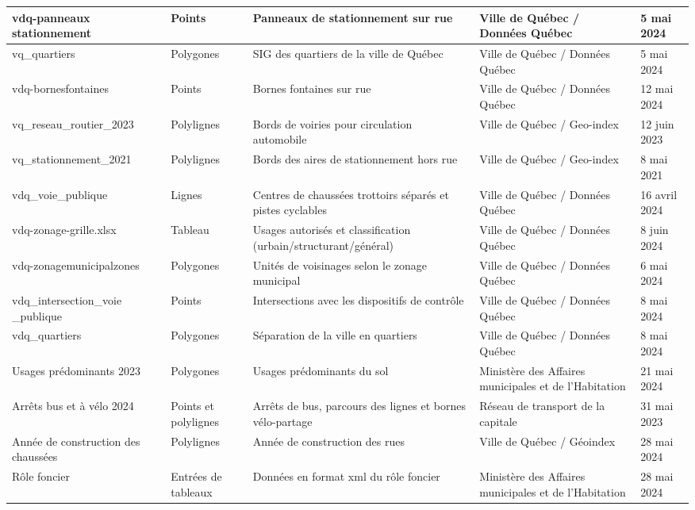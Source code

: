 \begin{landscape}
\begin{longtable}[h!]{p{.2 \linewidth} p{.1 \linewidth} p{.3 \linewidth} p{.15\linewidth} p{.125\linewidth} }
  
   vdq-panneaux stationnement    & Points        & Panneaux de stationnement sur rue          & Ville de Québec / Données Québec  & 5 mai 2024 \\
   \hline
   vq\_quartiers & Polygones & SIG des quartiers de la ville de Québec & Ville de Québec / Données Québec & 5 mai 2024 \\
   \hline
   vdq-bornesfontaines          & Points        & Bornes fontaines sur rue                   & Ville de Québec / Données Québec & 12 mai 2024 \\
   \hline
   vq\_reseau\_routier\_2023 & Polylignes    & Bords de voiries pour circulation automobile  & Ville de Québec / Geo-index  & 12 juin 2023\\ 
   \hline
   vq\_stationnement\_2021  & Polylignes    & Bords des aires de stationnement hors rue & Ville de Québec / Geo-index & 8 mai 2021\\
   \hline
   vdq\_voie\_publique            & Lignes        & Centres de chaussées trottoirs séparés et pistes cyclables & Ville de Québec / Données Québec & 16 avril 2024 \\
   \hline
   vdq-zonage-grille.xlsx          & Tableau        & Usages autorisés et classification (urbain/structurant/général) & Ville de Québec / Données Québec & 8 juin 2024 \\
   \hline
   vdq-zonagemunicipalzones          & Polygones        & Unités de voisinages selon le zonage municipal & Ville de Québec / Données Québec & 6 mai 2024 \\
   \hline
   vdq\_intersection\_voie \_publique & Points & Intersections avec les dispositifs de contrôle & Ville de Québec / Données Québec & 8 mai 2024 \\
   \hline
   vdq\_quartiers & Polygones &Séparation de la ville en quartiers & Ville de Québec / Données Québec & 8 mai 2024\\
   \hline
   Usages prédominants 2023  & Polygones & Usages prédominants du sol &   Ministère des Affaires municipales et de l'Habitation & 21 mai 2024 \\
   \hline
   Arrêts bus et à vélo 2024 & Points et polylignes & Arrêts de bus, parcours des lignes et bornes vélo-partage & Réseau de transport de la capitale & 31 mai 2023 \\
   \hline
   Année de construction des chaussées & Polylignes & Année de construction des rues & Ville de Québec / Géoindex & 28 mai 2024 \\
   \hline
   Rôle foncier & Entrées de tableaux & Données en format xml du rôle foncier & Ministère des Affaires municipales et de l'Habitation & 28 mai 2024 \\

\end{longtable}
\end{landscape}

